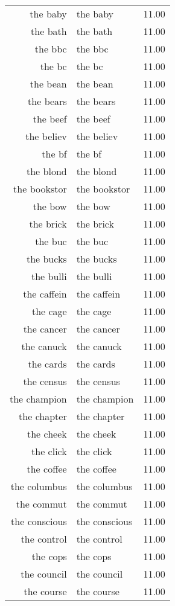 \begin{table}[ht]
\begin{tabular}{rlr}
  the baby & the baby & 11.00 \\ 
  the bath & the bath & 11.00 \\ 
  the bbc & the bbc & 11.00 \\ 
  the bc & the bc & 11.00 \\ 
  the bean & the bean & 11.00 \\ 
  the bears & the bears & 11.00 \\ 
  the beef & the beef & 11.00 \\ 
  the believ & the believ & 11.00 \\ 
  the bf & the bf & 11.00 \\ 
  the blond & the blond & 11.00 \\ 
  the bookstor & the bookstor & 11.00 \\ 
  the bow & the bow & 11.00 \\ 
  the brick & the brick & 11.00 \\ 
  the buc & the buc & 11.00 \\ 
  the bucks & the bucks & 11.00 \\ 
  the bulli & the bulli & 11.00 \\ 
  the caffein & the caffein & 11.00 \\ 
  the cage & the cage & 11.00 \\ 
  the cancer & the cancer & 11.00 \\ 
  the canuck & the canuck & 11.00 \\ 
  the cards & the cards & 11.00 \\ 
  the census & the census & 11.00 \\ 
  the champion & the champion & 11.00 \\ 
  the chapter & the chapter & 11.00 \\ 
  the cheek & the cheek & 11.00 \\ 
  the click & the click & 11.00 \\ 
  the coffee & the coffee & 11.00 \\ 
  the columbus & the columbus & 11.00 \\ 
  the commut & the commut & 11.00 \\ 
  the conscious & the conscious & 11.00 \\ 
  the control & the control & 11.00 \\ 
  the cops & the cops & 11.00 \\ 
  the council & the council & 11.00 \\ 
  the course & the course & 11.00 \\ 

\end{tabular}
\end{table}
